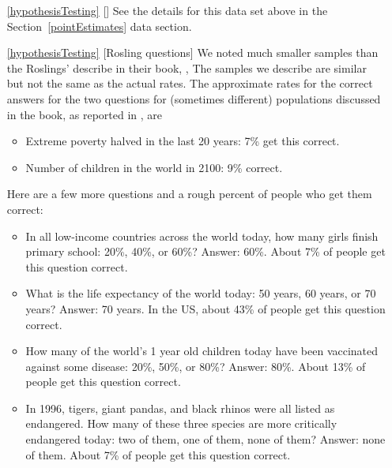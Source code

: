 \begin{itemize}
\item[\ref{hypothesisTesting}]
    [\datalink{pew\_energy\_2018}]
    See the details for this data set above
    in the Section~\ref{pointEstimates} data section.
\item[\ref{hypothesisTesting}]
    [Rosling questions]
    We noted much smaller samples than the Roslings'
    describe in their book,
    ,
    The samples we describe are similar but not
    the same as the actual rates.
    The approximate rates for the correct answers for the
    two questions for (sometimes different) populations
    discussed in the book, as reported in
    ,
    are
    \begin{itemize}
    \item
        Extreme poverty halved in the last 20 years:
        7\% get this correct.
    \item
        Number of children in the world in 2100:
        9\% correct.
    \end{itemize}
    Here are a few more questions and a rough percent
    of people who get them correct:
    \begin{itemize}
    \item
        In all low-income countries across the world today,
        how many girls finish primary school: 20\%, 40\%, or 60\%?
        Answer: 60\%.
        About 7\% of people get this question correct.
    \item
        What is the life expectancy of the world today:
        50 years, 60 years, or 70 years?
        Answer: 70 years.
        In the US, about 43\% of people get this question correct.
    \item
        How many of the world's 1 year old children today
        have been vaccinated against some disease:
        20\%, 50\%, or 80\%?
        Answer: 80\%.
        About 13\% of people get this question correct.
    \item
        In 1996, tigers, giant pandas, and black rhinos
        were all listed as endangered.
        How many of these three species are more
        critically endangered today:
        two of them,
        one of them,
        none of them?
        Answer: none of them.
        About 7\% of people get this question correct.

\end{itemize}
\end{itemize}
